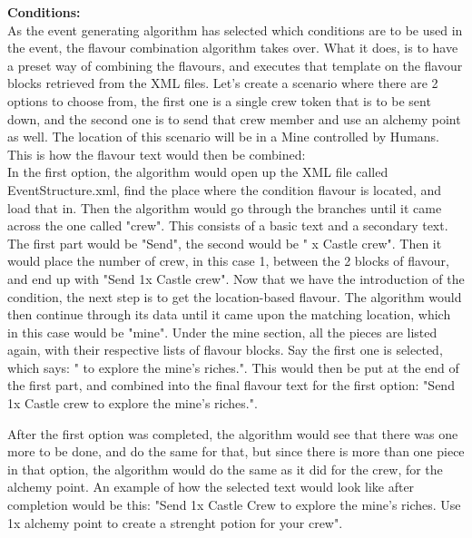 \textbf{Conditions:}\\
As the event generating algorithm has selected which conditions are to be used in the event, the flavour combination algorithm takes over. What it does, is to have a preset way of combining the flavours, and executes that template on the flavour blocks retrieved from the XML files. Let's create a scenario where there are 2 options to choose from, the first one is a single crew  token that is to be sent down, and the second one is to send that crew member and use an alchemy point as well. The location of this scenario will be in a Mine controlled by Humans.
This is how the flavour text would then be combined:\\
In the first option, the algorithm would open up the XML file called EventStructure.xml, find the place where the condition flavour is located, and load that in. Then the algorithm would go through the branches until it came across the one called "crew". This consists of a basic text and a secondary text. The first part would be "Send", the second would be " x Castle crew". Then it would place the number of crew, in this case 1, between the 2 blocks of flavour, and end up with "Send 1x Castle crew".
Now that we have the introduction of the condition, the next step is to get the location-based flavour. The algorithm would then continue through its data until it came upon the matching location, which in this case would be "mine". Under the mine section, all the pieces are listed again, with their respective lists of flavour blocks. Say the first one is selected, which says: " to explore the mine's riches.". This would then be put at the end of the first part, and combined into the final flavour text for the first option: "Send 1x Castle crew to explore the mine's riches.".

After the first option was completed, the algorithm would see that there was one more to be done, and do the same for that, but since there is more than one piece in that option, the algorithm would do the same as it did for the crew, for the alchemy point.
An example of how the selected text would look like after completion would be this: "Send 1x Castle Crew to explore the mine's riches. Use 1x alchemy point to create a strenght potion for your crew".\\

